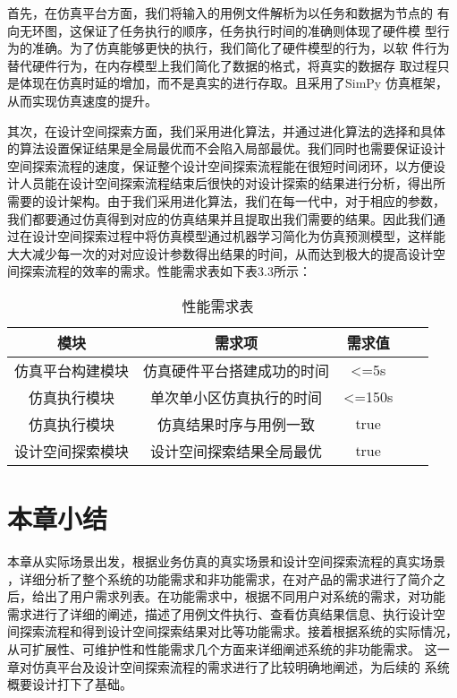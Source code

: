 首先，在仿真平台方面，我们将输入的用例文件解析为以任务和数据为节点的
有向无环图，这保证了任务执行的顺序，任务执行时间的准确则体现了硬件模
型行为的准确。为了仿真能够更快的执行，我们简化了硬件模型的行为，以软
件行为替代硬件行为，在内存模型上我们简化了数据的格式，将真实的数据存
取过程只是体现在仿真时延的增加，而不是真实的进行存取。且采用了SimPy
仿真框架，从而实现仿真速度的提升。

其次，在设计空间探索方面，我们采用进化算法，并通过进化算法的选择和具体
的算法设置保证结果是全局最优而不会陷入局部最优。我们同时也需要保证设计
空间探索流程的速度，保证整个设计空间探索流程能在很短时间闭环，以方便设
计人员能在设计空间探索流程结束后很快的对设计探索的结果进行分析，得出所
需要的设计架构。由于我们采用进化算法，我们在每一代中，对于相应的参数，
我们都要通过仿真得到对应的仿真结果并且提取出我们需要的结果。因此我们通
过在设计空间探索过程中将仿真模型通过机器学习简化为仿真预测模型，这样能
大大减少每一次的对对应设计参数得出结果的时间，从而达到极大的提高设计空
间探索流程的效率的需求。性能需求表如下表3.3所示：

\begin{table}[htb]
    \centering\normalsize
    \caption{性能需求表}
    \begin{tabular}{|c|c|c|ll}
    \hline
    模块       & 需求项           & 需求值               \\ \hline
    仿真平台构建模块 & 仿真硬件平台搭建成功的时间 & \textless{}=5s    \\ \hline
    仿真执行模块   & 单次单小区仿真执行的时间  & \textless{}=150s   \\ \hline
    仿真执行模块   & 仿真结果时序与用例一致   & true              \\ \hline
    设计空间探索模块 & 设计空间探索结果全局最优  & true              \\ \hline
    \end{tabular}
    \end{table}

\section{本章小结}
本章从实际场景出发，根据业务仿真的真实场景和设计空间探索流程的真实场景
，详细分析了整个系统的功能需求和非功能需求，在对产品的需求进行了简介之
后，给出了用户需求列表。在功能需求中，根据不同用户对系统的需求，对功能
需求进行了详细的阐述，描述了用例文件执行、查看仿真结果信息、执行设计空
间探索流程和得到设计空间探索结果对比等功能需求。接着根据系统的实际情况，
从可扩展性、可维护性和性能需求几个方面来详细阐述系统的非功能需求。
这一章对仿真平台及设计空间探索流程的需求进行了比较明确地阐述，为后续的
系统概要设计打下了基础。